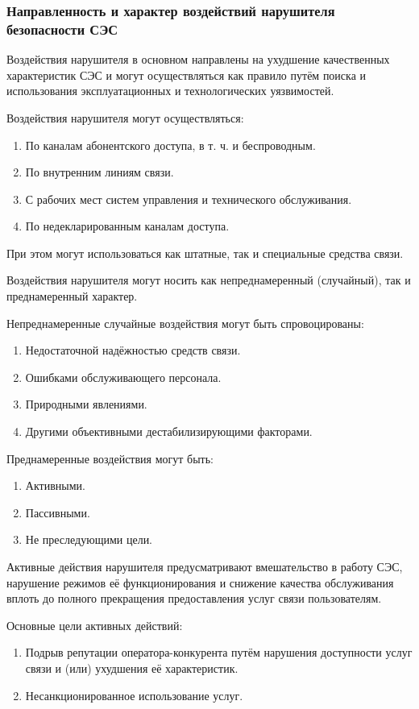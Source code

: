 \documentclass[12pt, russian, oneside, article]{ncc}
\begin{document}
\subsubsection{Направленность и характер воздействий нарушителя безопасности СЭС}
\label{sec-1_2_2}


Воздействия нарушителя в основном направлены на ухудшение качественных характеристик СЭС и могут осуществляться как правило путём поиска и использования эксплуатационных и технологических уязвимостей.

Воздействия нарушителя могут осуществляться:
\begin{enumerate}
\item По каналам абонентского доступа, в т. ч. и беспроводным.
\item По внутренним линиям связи.
\item С рабочих мест систем управления и технического обслуживания.
\item По недекларированным каналам доступа.
\end{enumerate}

При этом могут использоваться как штатные, так и специальные средства связи.

Воздействия нарушителя могут носить как непреднамеренный (случайный), так и преднамеренный характер.

Непреднамеренные случайные воздействия могут быть спровоцированы:
\begin{enumerate}
\item Недостаточной надёжностью средств связи.
\item Ошибками обслуживающего персонала.
\item Природными явлениями.
\item Другими объективными дестабилизирующими факторами.
\end{enumerate}

Преднамеренные воздействия могут быть:
\begin{enumerate}
\item Активными.
\item Пассивными.
\item Не преследующими цели.
\end{enumerate}

Активные действия нарушителя предусматривают вмешательство в работу СЭС, нарушение режимов её функционирования и снижение качества обслуживания вплоть до полного прекращения предоставления услуг связи пользователям.

Основные цели активных действий:
\begin{enumerate}
\item Подрыв репутации оператора-конкурента путём нарушения доступности услуг связи и (или) ухудшения её характеристик.
\item Несанкционированное использование услуг.
\end{enumerate}
\end{document}
